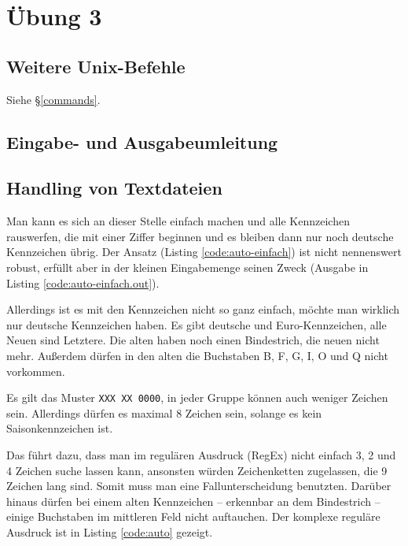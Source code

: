 \chapter{Übung 3}

\section{Weitere Unix-Befehle}

Siehe §\ref{commands}.

\section{Eingabe- und Ausgabeumleitung}



\section{Handling von Textdateien}

Man kann es sich an dieser Stelle einfach machen und alle Kennzeichen rauswerfen, die mit einer Ziffer beginnen und es bleiben dann nur noch deutsche Kennzeichen übrig. Der Ansatz (Listing \ref{code:auto-einfach}) ist nicht nennenswert robust, erfüllt aber in der kleinen Eingabemenge seinen Zweck (Ausgabe in Listing \ref{code:auto-einfach.out}).





Allerdings ist es mit den Kennzeichen nicht so ganz einfach, möchte man wirklich nur deutsche Kennzeichen haben. Es gibt deutsche und Euro-Kennzeichen, alle Neuen sind Letztere. Die alten haben noch einen Bindestrich, die neuen nicht mehr. Außerdem dürfen in den alten die Buchstaben B, F, G, I, O und Q nicht vorkommen.\cite{wiki-kfz}

Es gilt das Muster \texttt{XXX XX 0000}, in jeder Gruppe können auch weniger Zeichen sein. Allerdings dürfen es maximal 8 Zeichen sein, solange es kein Saisonkennzeichen ist.

Das führt dazu, dass man im regulären Ausdruck (RegEx) nicht einfach 3, 2 und 4 Zeichen suche lassen kann, ansonsten würden Zeichenketten zugelassen, die 9 Zeichen lang sind. Somit muss man eine Fallunterscheidung benutzten. Darüber hinaus dürfen bei einem alten Kennzeichen -- erkennbar an dem Bindestrich -- einige Buchstaben im mittleren Feld nicht auftauchen. Der komplexe reguläre Ausdruck ist in Listing \ref{code:auto} gezeigt.


